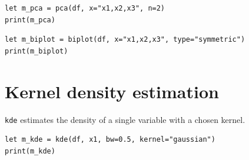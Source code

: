 \begin{lstlisting}[caption={PCA}]
let m_pca = pca(df, x="x1,x2,x3", n=2)
print(m_pca)
\end{lstlisting}

\begin{lstlisting}[caption={Biplot}]
let m_biplot = biplot(df, x="x1,x2,x3", type="symmetric")
print(m_biplot)
\end{lstlisting}

\section{Kernel density estimation}

\texttt{kde} estimates the density of a single variable with a chosen kernel.

\begin{lstlisting}[caption={KDE}]
let m_kde = kde(df, x1, bw=0.5, kernel="gaussian")
print(m_kde)
\end{lstlisting}
